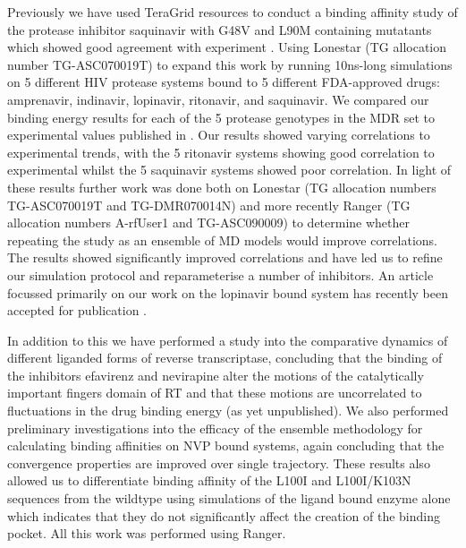 Previously we have used TeraGrid resources to conduct a binding affinity study of the protease inhibitor saquinavir with G48V and L90M containing mutatants which showed good agreement with experiment \cite{Stoica2008}. %
Using Lonestar (TG allocation number TG-ASC070019T) to expand this work by running 10ns-long simulations on 5 different HIV protease systems bound to 5 different FDA-approved drugs: amprenavir, indinavir, lopinavir, ritonavir, and saquinavir. We compared our binding energy results for each of the 5 protease genotypes in the MDR set to experimental values published in \cite{Ohtaka2003}. Our results showed varying correlations to experimental trends, with the 5 ritonavir systems showing good correlation to experimental whilst the 5 saquinavir systems showed poor correlation. In light of these results further work was done both on Lonestar (TG allocation numbers TG-ASC070019T and TG-DMR070014N) and more recently Ranger (TG allocation numbers A-rfUser1 and TG-ASC090009) to determine whether repeating the study as an ensemble of MD models would improve correlations. The results showed significantly improved correlations and have led us to refine our simulation protocol and reparameterise a number of inhibitors. An article focussed primarily on our work on the lopinavir bound system has recently been accepted for publication \cite{Sadiq2010}.

In addition to this we have performed a study into the comparative dynamics of different liganded forms of reverse transcriptase, concluding that the binding of the inhibitors efavirenz and nevirapine alter the motions of the catalytically important fingers domain of RT and that these motions are uncorrelated to fluctuations in the drug binding energy (as yet unpublished). We also performed preliminary investigations into the efficacy of the ensemble methodology for calculating binding affinities on NVP bound systems, again concluding that the convergence properties are improved over single trajectory. These results also allowed us to differentiate binding affinity of the L100I and L100I/K103N sequences from the wildtype using simulations of the ligand bound enzyme alone which indicates that they do not significantly affect the creation of the binding pocket. All this work was performed using Ranger. 

